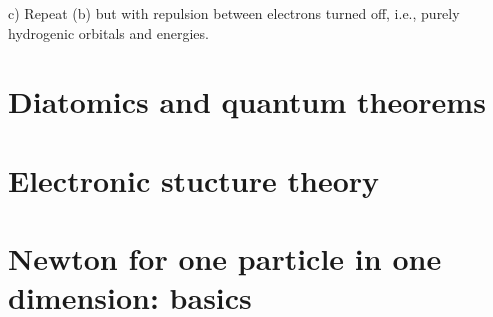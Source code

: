 c) Repeat (b) but with repulsion between electrons turned off, i.e.,
purely hydrogenic orbitals and energies.


\newpage

\part{Diatomics and quantum theorems}
\newpage
\part{Electronic stucture theory}
\label{page:end}


\part{Newton for one particle in one dimension: basics}
\newpage
{}

